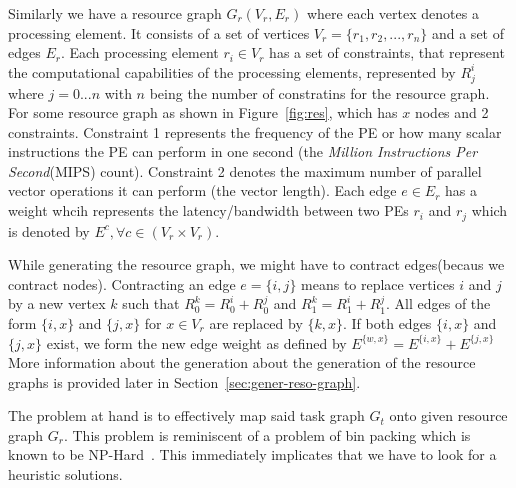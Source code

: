 \documentclass[10pt, conference, compsocconf]{IEEEtran}
\begin{document}

Similarly we have a resource graph $G_r(V_r, E_r)$ where each vertex
denotes a processing element. It consists of a set of vertices $V_r =
\{r_1, r_2, ... , r_n\}$ and a set of edges $E_r$. Each processing
element $r_i \in V_r$ has a set of constraints, that represent the
computational capabilities of the processing elements, represented by
$R^{i}_{j}$ where $j=0...n$ with $n$ being the number of constratins for
the resource graph. For some resource graph as shown in
Figure~\ref{fig:res}, which has $x$ nodes and 2 constraints. Constraint
1 represents the frequency of the PE or how many scalar instructions the
PE can perform in one second (the \textit{Million Instructions Per
  Second}(MIPS) count). Constraint 2 denotes the maximum number of
parallel vector operations it can perform (the vector length). Each edge
$e \in E_r$ has a weight whcih represents the latency/bandwidth between
two PEs $r_i$ and $r_j$ which is denoted by $E^c, \forall c \in (V_r
\times V_r)$.

While generating the resource graph, we might have to contract edges(becaus we
contract nodes). Contracting an edge $e=\{i,j\}$ means to replace vertices $i$ and
$j$ by a new vertex $k$ such that $R^k_0 = R^i_0 + R^j_0$ and $R^k_1 = R^i_1 +
R^j_1$. All edges of the form $\{i,x\}$ and $\{j,x\}$ for $x \in V_r$ are replaced
by $\{k,x\}$. If both edges $\{i,x\}$ and $\{j,x\}$ exist, we form the new edge weight
as defined by $E^{\{w,x\}} = E^{\{i,x\}} + E^{\{j,x\}}$ More information about the
generation about the generation of the resource graphs is provided later in
Section~\ref{sec:gener-reso-graph}.

The problem at hand is to effectively map said task graph $G_t$ onto
given resource graph $G_r$. This problem is reminiscent of a problem of
bin packing which is known to be NP-Hard~\cite{vsar89}. This immediately
implicates that we have to look for a heuristic solutions.
\end{document}
